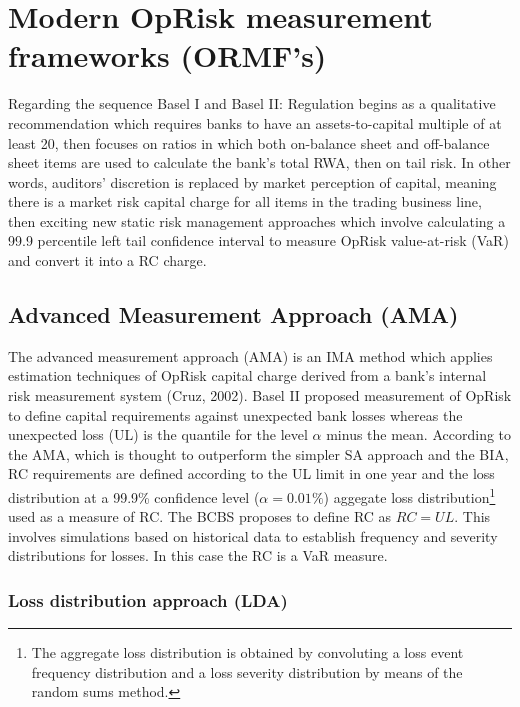 \documentclass{DissertateUSU}
\begin{document}
\section{Modern OpRisk measurement frameworks (ORMF's)}
\label{sec:Modern OpRisk measurement frameworks (ORMF's)}

Regarding the sequence Basel I and Basel II: Regulation begins as a
qualitative recommendation which requires banks to have an
assets-to-capital multiple of at least 20, then focuses on ratios in
which both on-balance sheet and off-balance sheet items are used to
calculate the bank's total RWA, then on tail risk. In other words,
auditors' discretion is replaced by market perception of capital,
meaning there is a market risk capital charge for all items in the
trading business line, then exciting new static risk management
approaches which involve calculating a 99.9 percentile left tail
confidence interval to measure OpRisk value-at-risk (VaR) and convert it
into a RC charge.\medskip

\subsection{Advanced Measurement Approach (AMA)}
\label{sec:Advanced Measurement Approach (AMA)}

The advanced measurement approach (AMA) is an IMA method which applies
estimation techniques of OpRisk capital charge derived from a bank's
internal risk measurement system (Cruz, 2002). Basel II proposed
measurement of OpRisk to define capital requirements against unexpected
bank losses whereas the unexpected loss (UL) is the quantile for the
level \(\alpha\) minus the mean. According to the AMA, which is thought
to outperform the simpler SA approach and the BIA, RC requirements are
defined according to the UL limit in one year and the loss distribution
at a 99.9\% confidence level (\(\alpha = 0.01\%\)) aggegate loss
distribution\footnote{The aggregate loss distribution is obtained by convoluting a loss event frequency distribution and a loss severity distribution by means of the random sums method.}
used as a measure of RC. The BCBS proposes to define RC as \(RC = UL\).
This involves simulations based on historical data to establish
frequency and severity distributions for losses. In this case the RC is
a VaR measure.\medskip

\subsubsection{Loss distribution approach (LDA)}
\label{sssec:Loss distribution approach (LDA)}
\end{document}
